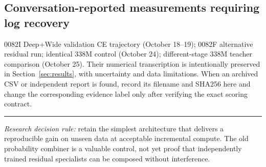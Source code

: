 \documentclass[11pt,letterpaper]{article}
\begin{document}
\subsection*{Conversation-reported measurements requiring log recovery}
0082I Deep+Wide validation CE trajectory (October 18--19); 0082F alternative residual run; identical 338M control (October 24); different-stage 338M teacher comparison (October 25). Their numerical transcription is intentionally preserved in Section~\ref{sec:results}, with uncertainty and data limitations. When an archived CSV or independent report is found, record its filename and SHA256 here and change the corresponding evidence label only after verifying the exact scoring contract.

\vfill\noindent\rule{\linewidth}{0.45pt}\par
\small\textit{Research decision rule:} retain the simplest architecture that delivers a reproducible gain on unseen data at acceptable incremental compute. The old probability combiner is a valuable control, not yet proof that independently trained residual specialists can be composed without interference.
\end{document}
